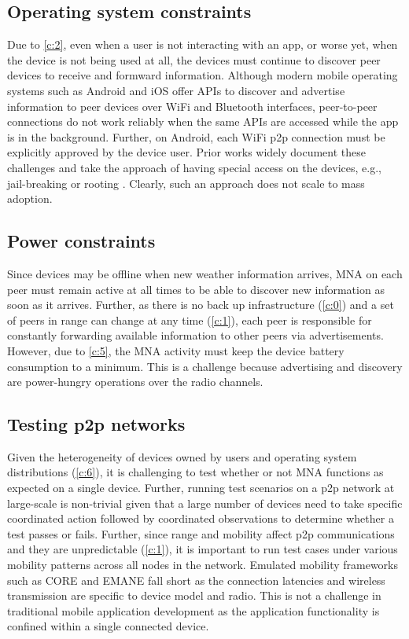 \documentclass[conference]{IEEEtran}
\begin{document}
\subsection{Operating system constraints}
\label{ch:os}
%
Due to \ref{c:2}, even when a user is not interacting with an app, or
worse yet, when the device is not being used at all, the devices must
continue to discover peer devices to receive and formward
information. Although modern mobile operating systems such as Android
and iOS offer APIs to discover and advertise information to peer
devices over WiFi and Bluetooth interfaces, peer-to-peer connections
do not work reliably when the same APIs are accessed while the app is
in the background. Further, on Android, each WiFi p2p connection must
be explicitly approved by the device user. Prior works widely document
these challenges and take the approach of having special access on the
devices, e.g., jail-breaking or rooting
\cite{gardner-stephen-serval-2011}. Clearly, such an approach does not
scale to mass adoption.\\
%
%
\subsection{Power constraints}
\label{ch:power}
%
Since devices may be offline when new weather information arrives, MNA
on each peer must remain active at all times to be able to discover
new information as soon as it arrives. Further, as there is no back up
infrastructure (\ref{c:0}) and a set of peers in range can change at
any time (\ref{c:1}), each peer is responsible for constantly
forwarding available information to other peers via
advertisements. However, due to \ref{c:5}, the MNA activity must keep
the device battery consumption to a minimum. This is a challenge
because advertising and discovery are power-hungry operations over the
radio channels.
%
\subsection{Testing p2p networks}
%
Given the heterogeneity of devices owned by users and operating system
distributions (\ref{c:6}), it is challenging to test whether or not
MNA functions as expected on a single device. Further, running test
scenarios on a p2p network at large-scale is non-trivial given that a
large number of devices need to take specific coordinated action
followed by coordinated observations to determine whether a test
passes or fails. Further, since range and mobility affect p2p
communications and they are unpredictable (\ref{c:1}), it is important
to run test cases under various mobility patterns across all nodes in
the network.  Emulated mobility frameworks such as CORE
\cite{arenholz-core-2008} and EMANE \cite{emane} fall short as the
connection latencies and wireless transmission are specific to device
model and radio.  This is not a challenge in traditional mobile
application development as the application functionality is confined
within a single connected device.
%
\end{document}
